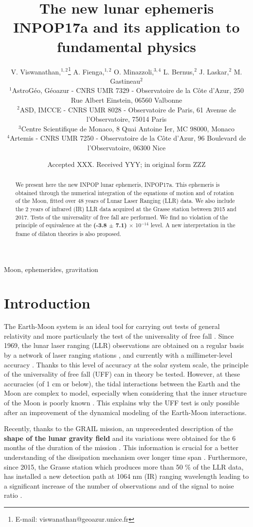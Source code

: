 \documentclass[fleqn,usenatbib,referee]{mnras}
\title[INPOP17a and fundamental physics tests]{The new lunar ephemeris INPOP17a and its application to fundamental physics}
\author[V. Viswanathan]{
V. Viswanathan,$^{1,2}$\thanks{E-mail: viswanathan@geoazur.unice.fr}%
A. Fienga,$^{1,2}$
O. Minazzoli,$^{3,4}$
L. Bernus,$^{2}$
J. Laskar,$^{2}$
M. Gastineau$^{2}$
\\
$^{1}$AstroG\'eo, G\'eoazur - CNRS UMR 7329 - Observatoire de la C\^ote d'Azur, 250 Rue Albert Einstein, 06560 Valbonne\\
$^{2}$ASD, IMCCE - CNRS UMR 8028 - Observatoire de Paris, 61 Avenue de l'Observatoire, 75014 Paris\\
$^{3}$Centre Scientifique de Monaco, 8 Quai Antoine Ier, MC 98000, Monaco\\
$^{4}$Artemis - CNRS UMR 7250 - Observatoire de la C\^ote d'Azur, 96 Boulevard de l'Observatoire, 06300 Nice
}
\date{Accepted XXX. Received YYY; in original form ZZZ}
\begin{document}
\label{firstpage}
\pagerange{\pageref{firstpage}--\pageref{lastpage}}
\maketitle

\begin{abstract}
We present here the new INPOP lunar ephemeris, INPOP17a. This ephemeris is obtained through the numerical integration of the equations of motion and of rotation of the Moon, fitted over 48 years of Lunar Laser Ranging (LLR) data. We also include the 2 years of infrared (IR) LLR data acquired at the Grasse station between 2015 and 2017. Tests of the universality of free fall are performed. We find no violation of the principle of equivalence at the \textbf{(-3.8 $\pm$ 7.1) $\times$} 10$^{-14}$ level. A new interpretation in the frame of dilaton theories is also proposed.
\end{abstract}

\begin{keywords}
Moon, ephemerides, gravitation
\end{keywords}

\section{Introduction}
The Earth-Moon system is an ideal tool for carrying out tests of general relativity and more particularly the test of the universality of free fall \cite[]{1968PhRv..169.1017N,1996ApJ...459..365A}. Since 1969, the lunar laser ranging (LLR) observations are obtained on a regular basis by a network of laser ranging stations \cite[]{Faller1969,Bender1973}, and currently with a millimeter-level accuracy \cite[]{Samain1998,Murphy2013a}. Thanks to this level of accuracy at the solar system scale, the principle of the universality of free fall (UFF) can in theory be tested. However, at these accuracies (of 1 cm or below), the tidal interactions between the Earth and the Moon are complex to model, especially when considering that the inner structure of the Moon is poorly known \cite[]{Wieczorek2007,Williams2015}. This explains why the UFF test is only possible after an improvement of the dynamical modeling of the Earth-Moon interactions.

Recently, thanks to the GRAIL mission, an unprecedented description of the \textbf{shape of the lunar gravity field} and its variations were obtained for the 6 months of the duration of the mission \textbf{\cite[]{2014GeoRL..41.1452K,Lemoine2014}}. This information is crucial for a better understanding of the dissipation mechanism over longer time span \textbf{\cite[]{2015GeoRL..42.7351M,Williams2015,2016GeoRL..43.8365M}}. Furthermore, since 2015, the Grasse station which produces more than 50 \% of the LLR data, has installed a new detection path at 1064 nm (IR) ranging wavelength leading to a significant increase of the number of observations and of the signal to noise ratio \cite[]{Courde2017}.
\end{document}
